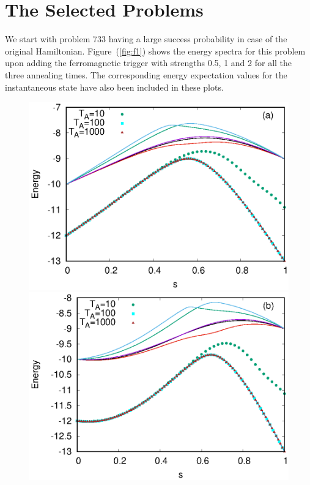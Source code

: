 \documentclass[../main.tex]{subfiles}
\begin{document}
\section{The Selected Problems}
We start with problem 733 having a large success probability in case of the original Hamiltonian. Figure~(\ref{fig:f1}) shows the energy spectra for this problem upon adding the ferromagnetic trigger with strengths 0.5, 1 and 2 for all the three annealing times. The corresponding  energy expectation values for the instantaneous state have also been included in these plots. 
\begin{figure}
\centering 
\includegraphics[scale=0.8]{733_s12_F_g0.eps}
\includegraphics[scale=0.8]{733_s12_F_g1.eps}

\end{figure}
\end{document}
